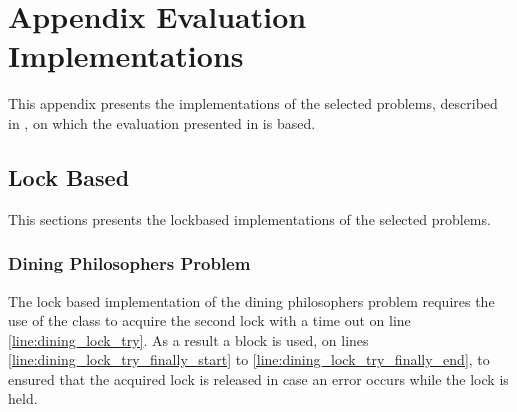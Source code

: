 \chapter[]{Appendix Evaluation Implementations}
This appendix presents the implementations of the selected problems, described in , on which the evaluation presented in  is based.
\label{app:eval_implementations}

\section{Lock Based}\label{app:impl_lockbased}
This sections presents the lockbased implementations of the selected problems.

\subsection{Dining Philosophers Problem}
The lock based implementation of the dining philosophers problem requires the use of the  class to acquire the second lock with a time out on line \ref{line:dining_lock_try}. As a result a  block is used, on lines \ref{line:dining_lock_try_finally_start} to \ref{line:dining_lock_try_finally_end}, to ensured that the acquired lock is released in case an error occurs while the lock is held.
